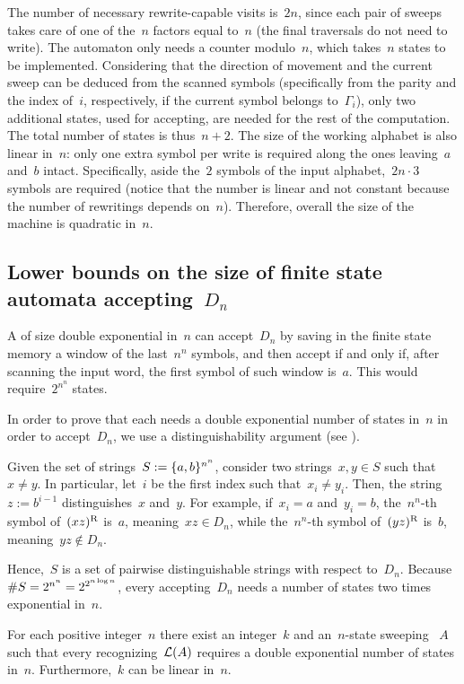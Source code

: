 The number of necessary rewrite-capable visits is~$2n$, since each pair of sweeps takes care of one of the~$n$ factors equal to~$n$ (the final traversals do not need to write).
The automaton only needs a counter modulo~$n$, which takes~$n$ states to be implemented.
Considering that the direction of movement and the current sweep can be deduced from the scanned symbols (specifically from the parity and the index of~$i$, respectively, if the current symbol belongs to~$\Gamma_i$), only two additional states, used for accepting, are needed for the rest of the computation.
The total number of states is thus~$n+2$.
The size of the working alphabet is also linear in~$n$: only one extra symbol per write is required along the ones leaving~$a$ and~$b$ intact.
Specifically, aside the~$2$ symbols of the input alphabet,~$2n\cdot3$ symbols are required (notice that the number is linear and not constant because the number of rewritings depends on~$n$).
Therefore, overall the size of the machine is quadratic in~$n$.

\subsection[Size of finite state automata accepting \texorpdfstring{$D_n$}{Ln}]{Lower bounds on the size of finite state automata accepting~$D_n$}
A \ODFA of size double exponential in~$n$ can accept~$D_n$ by saving in the finite state memory a window of the last~$n^n$ symbols, and then accept if and only if, after scanning the input word, the first symbol of such window is~$a$.
This would require~$2^{n^n}$ states.

In order to prove that each \ODFA needs a double exponential number of states in~$n$ in order to accept~$D_n$, we use a distinguishability argument (see ).

Given the set of strings~$S:=\{a,b\}^{n^n}$, consider two strings~$x,y\in S$ such that~$x\ne y$.
In particular, let~$i$ be the first index such that~$x_i\ne y_i$.
Then, the string~$z:=b^{i-1}$ distinguishes~$x$ and~$y$.
For example, if~$x_i=a$ and~$y_i=b$, the~$n^n$-th symbol of~$(xz)^{\mathrm R}$ is~$a$, meaning~$xz\in D_n$, while the~$n^n$-th symbol of~$(yz)^{\mathrm R}$ is~$b$, meaning~$yz\notin D_n$.

Hence,~$S$ is a set of pairwise distinguishable strings with respect to~$D_n$.
Because~$\# S=2^{n^n}=2^{2^{n\log n}}$, every \ODFA accepting~$D_n$ needs a number of states two times exponential in~$n$.

\begin{thrm}
	For each positive integer~$n$ there exist an integer~$k$ and an~$n$-state sweeping \kDLA~$A$ such that every \ODFA recognizing~$\mathcal L(A)$ requires a double exponential number of states in~$n$.
	Furthermore,~$k$ can be linear in~$n$.
\end{thrm}


